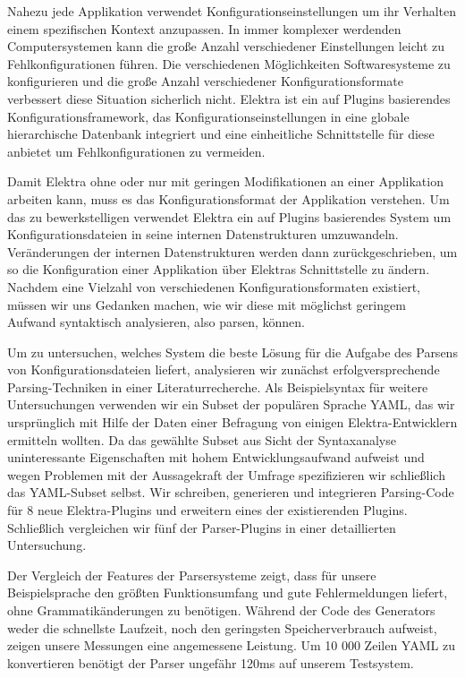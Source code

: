 \begin{kurzfassung}
Nahezu jede Applikation verwendet Konfigurationseinstellungen um ihr Verhalten einem spezifischen Kontext anzupassen. In immer komplexer werdenden Computersystemen kann die große Anzahl verschiedener Einstellungen leicht zu Fehlkonfigurationen führen. Die verschiedenen Möglichkeiten Softwaresysteme zu konfigurieren und die große Anzahl verschiedener Konfigurationsformate verbessert diese Situation sicherlich nicht. Elektra ist ein auf Plugins basierendes Konfigurationsframework, das Konfigurationseinstellungen in eine globale hierarchische Datenbank integriert und eine einheitliche Schnittstelle für diese anbietet um Fehlkonfigurationen zu vermeiden.

Damit Elektra ohne oder nur mit geringen Modifikationen an einer Applikation arbeiten kann, muss es das Konfigurationsformat der Applikation verstehen. Um das zu bewerkstelligen verwendet Elektra ein auf Plugins basierendes System um Konfigurationsdateien in seine internen Datenstrukturen umzuwandeln. Veränderungen der internen Datenstrukturen werden dann zurückgeschrieben, um so die Konfiguration einer Applikation über Elektras Schnittstelle zu ändern. Nachdem eine Vielzahl von verschiedenen Konfigurationsformaten existiert, müssen wir uns Gedanken machen, wie wir diese mit möglichst geringem Aufwand syntaktisch analysieren, also parsen, können.

Um zu untersuchen, welches System die beste Lösung für die Aufgabe des Parsens von Konfigurationsdateien liefert, analysieren wir zunächst erfolgversprechende Parsing-Techniken in einer Literaturrecherche. Als Beispielsyntax für weitere Untersuchungen verwenden wir ein Subset der populären Sprache YAML, das wir ursprünglich mit Hilfe der Daten einer Befragung von einigen Elektra-Entwicklern ermitteln wollten. Da das gewählte Subset aus Sicht der Syntaxanalyse uninteressante Eigenschaften mit hohem Entwicklungsaufwand aufweist und wegen Problemen mit der Aussagekraft der Umfrage spezifizieren wir schließlich das YAML-Subset selbst. Wir schreiben, generieren und integrieren Parsing-Code für 8 neue Elektra-Plugins und erweitern eines der existierenden Plugins. Schließlich vergleichen wir fünf der Parser-Plugins in einer detaillierten Untersuchung.

Der Vergleich der Features der Parsersysteme zeigt, dass für unsere Beispielsprache  den größten Funktionsumfang und gute Fehlermeldungen liefert, ohne Grammatikänderungen zu benötigen. Während der Code des Generators weder die schnellste Laufzeit, noch den geringsten Speicherverbrauch aufweist, zeigen unsere Messungen eine angemessene Leistung. Um 10 000 Zeilen YAML zu konvertieren benötigt der Parser ungefähr 120ms auf unserem Testsystem.
\end{kurzfassung}
